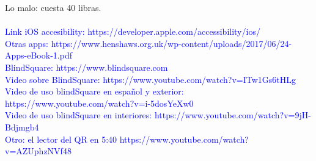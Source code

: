 \documentclass{article}
\begin{document}
	Lo malo: cuesta 40 libras.
	\\
	\\
	\textcolor{blue}{Link iOS accesibility: 	https://developer.apple.com/accessibility/ios/
	\\
	Otras apps: https://www.henshaws.org.uk/wp-content/uploads/2017/06/24-Apps-eBook-1.pdf
	\\
	BlindSquare: https://www.blindsquare.com
	\\
	Video sobre BlindSquare: https://www.youtube.com/watch?v=ITw1Gs6tHLg
	\\
	Video de uso blindSquare en español y exterior: https://www.youtube.com/watch?v=i-5dosYeXw0
	\\
	Video de uso blindSquare en interiores: https://www.youtube.com/watch?v=9jH-Bdjmgb4
	\\
	Otro: el lector del QR en 5:40
	https://www.youtube.com/watch?v=AZUphzNVf48
	}
	
	
\end{document}
